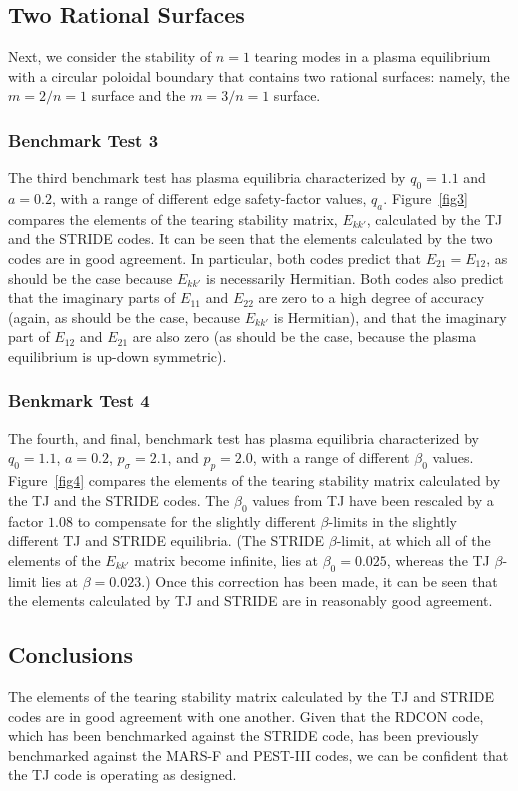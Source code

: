 \documentclass[12pt,prb,aps]{revtex4-1}
\begin{document}
\subsection{Two Rational Surfaces}
 Next, we consider the stability of $n=1$ tearing modes 
in a  plasma equilibrium with a circular poloidal boundary  that  contains two rational surfaces: namely, the $m=2/n=1$ surface and the $m=3/n=1$ surface. 

\subsubsection{Benchmark Test 3}
The third benchmark test has plasma equilibria characterized by $q_0=1.1$ and $a=0.2$, with a range of different edge safety-factor values, $q_a$. 
Figure~\ref{fig3} compares the elements of the tearing stability matrix, $E_{kk'}$,  calculated by the TJ and the STRIDE codes. It can be seen that the elements calculated by
the two codes are in good agreement. In particular, both codes predict that $E_{21}=E_{12}$, as should be the case because $E_{kk'}$ is necessarily Hermitian.\cite{tj} 
Both codes also predict that the imaginary parts of $E_{11}$ and $E_{22}$ are zero to a high degree of accuracy (again, as should be the case, because $E_{kk'}$ is Hermitian),
and that the imaginary part of $E_{12}$ and $E_{21}$ are also zero (as should be the case, because the plasma equilibrium is up-down symmetric). 

\subsubsection{Benkmark Test 4}
The fourth, and final,  benchmark test has plasma equilibria characterized by $q_0=1.1$, $a=0.2$, $p_\sigma = 2.1$, and $p_p=2.0$, with a range of different $\beta_0$ values.  
Figure~\ref{fig4} compares the elements of the tearing stability matrix calculated by the TJ and the STRIDE codes. The $\beta_0$ values from TJ have been rescaled
by a factor $1.08$ to compensate for the slightly different $\beta$-limits in the slightly different TJ and STRIDE equilibria. (The STRIDE $\beta$-limit, at which all of the
elements of the $E_{kk'}$ matrix become infinite,  lies at
$\beta_0=0.025$, whereas the TJ $\beta$-limit lies at $\beta=0.023$.)
 Once this correction has been made, it can be seen that the elements calculated by
TJ and STRIDE are in reasonably good agreement.  

\subsection{Conclusions}
The elements of the tearing stability matrix calculated by the TJ and STRIDE codes are in good agreement with one another. Given  that the RDCON code,
which has been benchmarked against the STRIDE code, has been previously benchmarked against the MARS-F and PEST-III codes,\cite{am2,aglas2} we can be confident  that the TJ code is operating as designed. 
\end{document}
